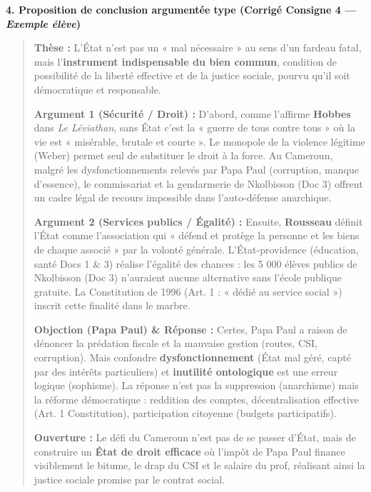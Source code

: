 \documentclass[11pt]{article}
\newcommand{\cle}[1]{{\popxbold\color{popdark}#1}}
\begin{document}
\begin{exoresolu}
\noindent\textbf{4. Proposition de conclusion argumentée type (Corrigé Consigne 4 — \textit{Exemple élève})}

\begin{quote}
\textbf{Thèse :} L'État n'est pas un « mal nécessaire » au sens d'un fardeau fatal, mais l'\textbf{instrument indispensable du bien commun}, condition de possibilité de la liberté effective et de la justice sociale, pourvu qu'il soit démocratique et responsable.

\textbf{Argument 1 (Sécurité / Droit) :} D'abord, comme l'affirme \textbf{Hobbes} dans \emph{Le Léviathan}, sans État c'est la « guerre de tous contre tous » où la vie est « misérable, brutale et courte ». Le monopole de la violence légitime (Weber) permet seul de substituer le droit à la force. Au Cameroun, malgré les dysfonctionnements relevés par Papa Paul (corruption, manque d'essence), le commissariat et la gendarmerie de Nkolbisson (Doc 3) offrent un cadre légal de recours impossible dans l'auto-défense anarchique.

\textbf{Argument 2 (Services publics / Égalité) :} Ensuite, \textbf{Rousseau} définit l'État comme l'association qui « défend et protège la personne et les biens de chaque associé » par la \cle{volonté générale}. L'État-providence (éducation, santé Docs 1 \& 3) réalise l'égalité des chances : les 5 000 élèves publics de Nkolbisson (Doc 3) n'auraient aucune alternative sans l'école publique gratuite. La Constitution de 1996 (Art. 1 : « dédié au service social ») inscrit cette finalité dans le marbre.

\textbf{Objection (Papa Paul) \& Réponse :} Certes, Papa Paul a raison de dénoncer la \cle{prédation fiscale} et la \cle{mauvaise gestion} (routes, CSI, corruption). Mais confondre \textbf{dysfonctionnement} (État mal géré, capté par des intérêts particuliers) et \textbf{inutilité ontologique} est une erreur logique (sophisme). La réponse n'est pas la suppression (anarchisme) mais la \cle{réforme démocratique} : reddition des comptes, décentralisation effective (Art. 1 Constitution), participation citoyenne (budgets participatifs).

\textbf{Ouverture :} Le défi du Cameroun n'est pas de se passer d'État, mais de construire un \textbf{État de droit efficace} où l'impôt de Papa Paul finance visiblement le bitume, le drap du CSI et le salaire du prof, réalisant ainsi la \cle{justice sociale} promise par le contrat social.
\end{quote}


\end{exoresolu}
\end{document}
